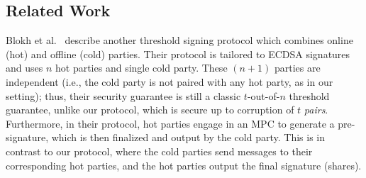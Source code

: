 \subsection{Related Work}

Blokh et al.~\cite{EPRINT:BloMakPel22} describe another threshold signing protocol which combines online (hot) and offline (cold) parties. Their protocol is tailored to ECDSA signatures and uses $n$ hot parties and single cold party. These $(n+1)$ parties are independent (i.e., the cold party is not paired with any hot party, as in our setting); thus, their security guarantee is still a classic $t$-out-of-$n$ threshold guarantee, unlike our protocol, which is secure up to corruption of $t$ \emph{pairs}. Furthermore, in their protocol, hot parties engage in an MPC to generate a pre-signature, which is then finalized and output by the cold party. This is in contrast to our protocol, where the cold parties send messages to their corresponding hot parties, and the hot parties output the final signature (shares).
